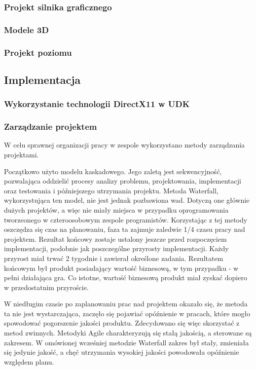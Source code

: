 \documentclass[10pt,a4paper,onecolumn]{article}
\begin{document}
\subsubsection{Projekt silnika graficznego}
\subsubsection{Modele 3D}
\subsubsection{Projekt poziomu}

\subsection{Implementacja}
\subsubsection{Wykorzystanie technologii DirectX11 w UDK}
\subsubsection{Zarządzanie projektem}
W celu sprawnej organizacji pracy w zespole wykorzystano metody zarządzania projektami. 

Początkowo użyto modelu kaskadowego. Jego zaletą jest sekwencyjność, pozwalająca oddzielić procesy analizy problemu, projektowania, implementacji oraz testowania i późniejszego utrzymania projektu. Metoda Waterfall, wykorzystująca ten model, nie jest jednak pozbawiona wad. 
Dotyczą one głównie dużych projektów, a więc nie miały miejsca w przypadku oprogramowania tworzeonego w czteroosobowym zespole programistów. Korzystając z tej metody oszczędza się czas na planowaniu, faza ta zajmuje zaledwie 1/4 czasu pracy nad projektem. Rezultat końcowy zostaje ustalony jeszcze przed rozpoczęciem implementacji, podobnie jak poszczególne przyrosty implementacji. Każdy przyrost miał trwać 2 tygodnie i zawierał określone zadania. Rezultatem końcowym był produkt posiadający wartość biznesową, w tym przypadku - w pełni działająca gra. Co istotne, wartość biznesową produkt miał zyskać dopiero w przedostatnim przyroście.

W niedługim czasie po zaplanowaniu prac nad projektem okazało się, że metoda ta nie jest wystarczająca, zaczęło się pojawiać opóźnienie w pracach, które mogło spowodować pogorszenie jakości produktu. Zdecydowano się więc skorzystać z metod zwinnych. Metodyki Agile charakteryzują się stałą jakością, a sterowane są zakresem. W omówionej wcześniej metodzie Waterfall zakres był stały, zmieniała się jedynie jakość, a chęć utrzymania wysokiej jakości powodowała opóźnienie względem planu. 
\end{document}
